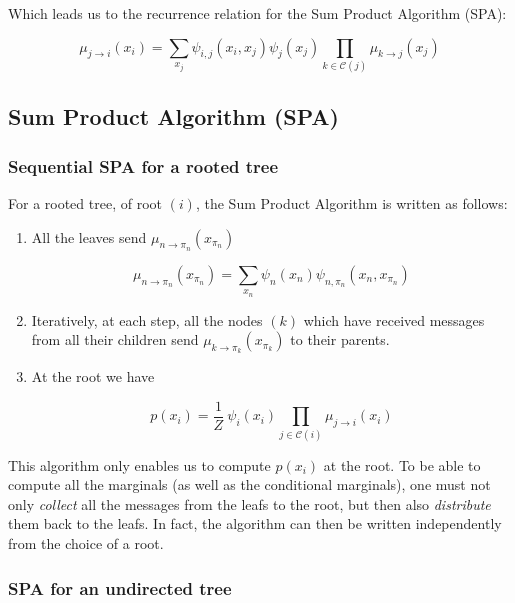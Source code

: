 \documentclass[12pt,a4paper]{report}
\begin{document}
Which leads us to the recurrence relation for the Sum Product Algorithm (SPA):

\begin{equation}
	\boxed{ \mu_{j \rightarrow i}(x_i) =  \sum_{x_j} \psi_{i,j} (x_i,x_j) \psi_j (x_j) \prod_{k \in \mathcal{C}(j)} \mu_{k \rightarrow j}(x_j) }
\end{equation}

\subsection{Sum Product Algorithm (SPA)}

\subsubsection{Sequential SPA for a rooted tree}

For a rooted tree, of root \( (i) \), the Sum Product Algorithm is written as follows: 

\begin{enumerate}
	\item All the leaves send \( \mu_{n \rightarrow \pi_n}(x_{\pi_n}) \)
	
	\begin{equation}
		\mu_{n \rightarrow \pi_n}(x_{\pi_n}) = \sum_{x_n} \psi_n (x_n) \psi_{n,\pi_n} (x_n,x_{\pi_n}) 
	\end{equation}
	
	\item Iteratively, at each step, all the nodes \( (k) \) which have received messages from all their children send \( \mu_{k \rightarrow \pi_k}(x_{\pi_k}) \) to their parents.
	
	\item At the root we have
	
	\begin{equation}
		p(x_i) = \frac{1}{Z} \ \psi_i (x_i) \prod_{j \in \mathcal{C}(i)} \mu_{j \rightarrow i} (x_i)
	\end{equation}
\end{enumerate}
This algorithm only enables us to compute $p(x_i)$ at the root. To be able to compute all the marginals (as well as the conditional marginals), one must not only \emph{collect} all the messages from the leafs to the root, but then also \emph{distribute} them back to the leafs. In fact, the algorithm can then be written independently from the choice of a root.

\subsubsection{SPA for an undirected tree}
\end{document}
